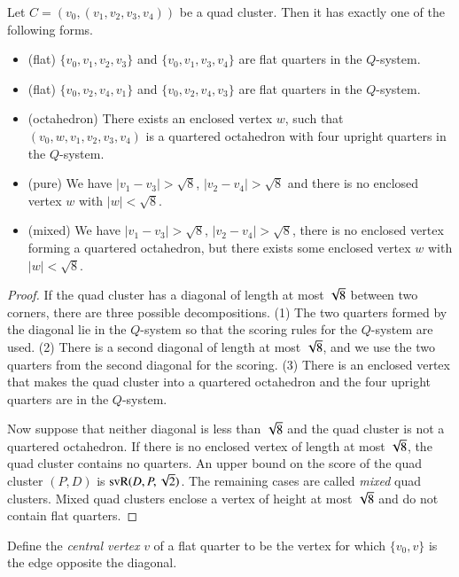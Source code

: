\begin{lemma}\label{quad:classify}
Let $C=(v_0,(v_1,v_2,v_3,v_4))$ be a quad cluster.  Then it has
exactly one of the following forms.
\begin{itemize}
  \item (flat) $\{v_0,v_1,v_2,v_3\}$ and $\{v_0,v_1,v_3,v_4\}$ are flat
    quarters in the $Q$-system.
   \item (flat) $\{v_0,v_2,v_4,v_1\}$ and $\{v_0,v_2,v_4,v_3\}$ are flat
     quarters in the $Q$-system.
     \item (octahedron) There exists an enclosed vertex $w$, such that
       $(v_0,w,v_1,v_2,v_3,v_4)$ is a quartered octahedron with
       four upright quarters in the $Q$-system.
   \item (pure) We have $|v_1-v_3|>\sqrt8$, $|v_2-v_4|>\sqrt8$ and
     there is no enclosed vertex $w$ with $|w|<\sqrt8$.
    \item (mixed) We have $|v_1-v_3|>\sqrt8$, $|v_2-v_4|>\sqrt8$, there
      is no enclosed vertex forming a quartered octahedron, but
      there exists some enclosed vertex $w$ with $|w|<\sqrt8$.
\end{itemize}
\end{lemma}

\begin{proof}
If the quad cluster has a diagonal of length at most $\sqrt8$
between two corners, there are three possible decompositions. (1)
The two quarters formed by the diagonal lie in the $Q$-system so
that the scoring rules for the $Q$-system are used.  (2) There is
a second diagonal of length at most $\sqrt8$, and we use the two
quarters from the second diagonal for the scoring. (3) There is an
enclosed vertex that makes the quad cluster into a quartered
octahedron and the four upright quarters are in the $Q$-system.

Now suppose that neither diagonal is less than $\sqrt8$ and the
quad cluster is not a quartered octahedron. If there is no
enclosed vertex of length at most $\sqrt8$, the quad cluster
contains no quarters. An upper bound on the score of the quad
cluster $(P,D)$ is ${\operatorname{svR}}(D,P,\sqrt2)$. The remaining cases are
called {\it mixed\/} quad clusters. Mixed quad clusters enclose a
vertex of height at most $\sqrt8$ and do not contain flat quarters.
\end{proof}



\begin{definition}
Define the {\it central vertex\/} $v$ of a flat quarter to be the
vertex for which $\{v_0,v\}$ is the edge opposite the diagonal.
\end{definition}






